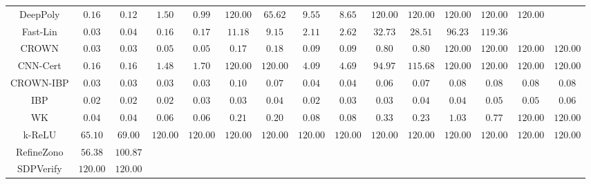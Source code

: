 \begin{table*}
{\begin{tabular}{c|c|c|c|c|c|c|c|c|c|c|c|c|c|c}
     DeepPoly &        $0.16$ &        $0.12$ &        $1.50$ &        $0.99$ &      $120.00$ &       $65.62$ &        $9.55$ &        $8.65$ &      $120.00$ &      $120.00$ &      $120.00$ &      $120.00$ &      $120.00$ &               \\
     Fast-Lin &        $0.03$ &        $0.04$ &        $0.16$ &        $0.17$ &       $11.18$ &        $9.15$ &        $2.11$ &        $2.62$ &       $32.73$ &       $28.51$ &       $96.23$ &      $119.36$ &               &               \\
        CROWN &        $0.03$ &        $0.03$ &        $0.05$ &        $0.05$ &        $0.17$ &        $0.18$ &        $0.09$ &        $0.09$ &        $0.80$ &        $0.80$ &      $120.00$ &      $120.00$ &      $120.00$ &      $120.00$ \\
     CNN-Cert &        $0.16$ &        $0.16$ &        $1.48$ &        $1.70$ &      $120.00$ &      $120.00$ &        $4.09$ &        $4.69$ &       $94.97$ &      $115.68$ &      $120.00$ &      $120.00$ &      $120.00$ &      $120.00$ \\
    CROWN-IBP &        $0.03$ &        $0.03$ &        $0.03$ &        $0.03$ &        $0.10$ &        $0.07$ &        $0.04$ &        $0.04$ &        $0.06$ &        $0.07$ &        $0.08$ &        $0.08$ &        $0.08$ &        $0.08$ \\
          IBP &        $0.02$ &        $0.02$ &        $0.02$ &        $0.03$ &        $0.03$ &        $0.04$ &        $0.02$ &        $0.03$ &        $0.03$ &        $0.04$ &        $0.04$ &        $0.05$ &        $0.05$ &        $0.06$ \\
           WK &        $0.04$ &        $0.04$ &        $0.06$ &        $0.06$ &        $0.21$ &        $0.20$ &        $0.08$ &        $0.08$ &        $0.33$ &        $0.23$ &        $1.03$ &        $0.77$ &      $120.00$ &      $120.00$ \\
       k-ReLU &       $65.10$ &       $69.00$ &      $120.00$ &      $120.00$ &      $120.00$ &      $120.00$ &      $120.00$ &      $120.00$ &      $120.00$ &      $120.00$ &      $120.00$ &      $120.00$ &      $120.00$ &      $120.00$ \\
   RefineZono &       $56.38$ &      $100.87$ &               &               &               &               &               &               &               &               &               &               &               &               \\
    SDPVerify &      $120.00$ &      $120.00$ &               &               &               &               &               &               &               &               &               &               &               &               \\

\end{tabular}}
\end{table*}
